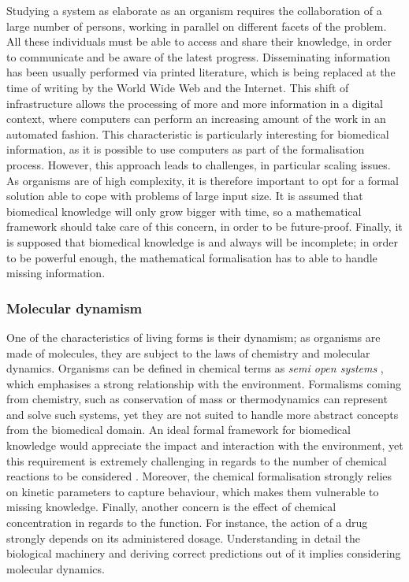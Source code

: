 Studying a system as elaborate as an organism requires the collaboration of a large number of persons, working in parallel on different facets of the problem. All these individuals must be able to access and share their knowledge, in order to communicate and be aware of the latest progress. Disseminating information has been usually performed via printed literature, which is being replaced at the time of writing by the World Wide Web and the Internet. This shift of infrastructure allows the processing of more and more information in a digital context, where computers can perform an increasing amount of the work in an automated fashion. This characteristic is particularly interesting for biomedical information, as it is possible to use computers as part of the formalisation process. However, this approach leads to challenges, in particular scaling issues. As organisms are of high complexity, it is therefore important to opt for a formal solution able to cope with problems of large input size. It is assumed that biomedical knowledge will only grow bigger with time, so a mathematical framework should take care of this concern, in order to be future-proof. Finally, it is supposed that biomedical knowledge is and always will be incomplete; in order to be powerful enough, the mathematical formalisation has to able to handle missing information.

\subsubsection{Molecular dynamism}
\label{reqdyn}

One of the characteristics of living forms is their dynamism; as organisms are made of molecules, they are subject to the laws of chemistry and molecular dynamics. Organisms can be defined in chemical terms as \emph{semi open systems} \citep{meng2004modeling}, which emphasises a strong relationship with the environment. Formalisms coming from chemistry, such as conservation of mass \citep{masswiki} or thermodynamics \citep{thermowiki} can represent and solve such systems, yet they are not suited to handle more abstract concepts from the biomedical domain. An ideal formal framework for biomedical knowledge would appreciate the impact and interaction with the environment, yet this requirement is extremely challenging in regards to the number of chemical reactions to be considered \citep{meng2004modeling}. Moreover, the chemical formalisation strongly relies on kinetic parameters to capture behaviour, which makes them vulnerable to missing knowledge. Finally, another concern is the effect of chemical concentration in regards to the function. For instance, the action of a drug strongly depends on its administered dosage. Understanding in detail the biological machinery and deriving correct predictions out of it implies considering molecular dynamics.

